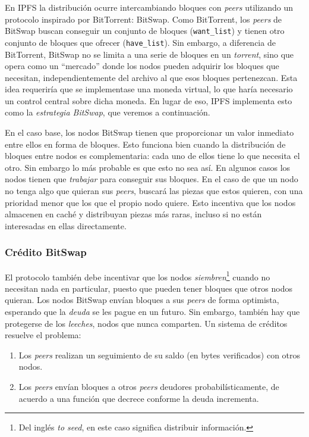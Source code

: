 \documentclass[12pt]{article} %
\begin{document}
En IPFS la distribución ocurre intercambiando bloques con \textit{peers} utilizando un protocolo inspirado por BitTorrent: BitSwap. Como BitTorrent, los \textit{peers} de BitSwap buscan conseguir un conjunto de bloques (\texttt{want\_list}) y tienen otro conjunto de bloques que ofrecer (\texttt{have\_list}). Sin embargo, a diferencia de BitTorrent, BitSwap no se limita a una serie de bloques en un \textit{torrent}, sino que opera como un ``mercado'' donde los nodos pueden adquirir los bloques que necesitan, independientemente del archivo al que esos bloques pertenezcan. Esta idea requeriría que se implementase una moneda virtual, lo que haría necesario un control central sobre dicha moneda. En lugar de eso, IPFS implementa esto como la \textit{estrategia BitSwap}, que veremos a continuación.

En el caso base, los nodos BitSwap tienen que proporcionar un valor inmediato entre ellos en forma de bloques. Esto funciona bien cuando la distribución de bloques entre nodos es complementaria: cada uno de ellos tiene lo que necesita el otro. Sin embargo lo más probable es que esto no sea así. En algunos casos los nodos tienen que \textit{trabajar} para conseguir sus bloques. En el caso de que un nodo no tenga algo que quieran sus \textit{peers}, buscará las piezas que estos quieren, con una prioridad menor que los que el propio nodo quiere. Esto incentiva que los nodos almacenen en caché y distribuyan piezas más raras, incluso si no están interesadas en ellas directamente.

\subsubsection{Crédito BitSwap} %
\label{ssub:crédito_bitswap}

El protocolo también debe incentivar que los nodos \textit{siembren}\footnote{Del inglés \textit{to seed}, en este caso significa distribuir información.} cuando no necesitan nada en particular, puesto que pueden tener bloques que otros nodos quieran. Los nodos BitSwap envían bloques a sus \textit{peers} de forma optimista, esperando que la \textit{deuda} se les pague en un futuro. Sin embargo, también hay que protegerse de los \textit{leeches}, nodos que nunca comparten. Un sistema de créditos resuelve el problema:
\begin{enumerate}
	\item Los \textit{peers} realizan un seguimiento de su saldo (en bytes verificados) con otros nodos.
	\item Los \textit{peers} envían bloques a otros \textit{peers} deudores probabilísticamente, de acuerdo a una función que decrece conforme la deuda incrementa.
\end{enumerate}
\end{document}
